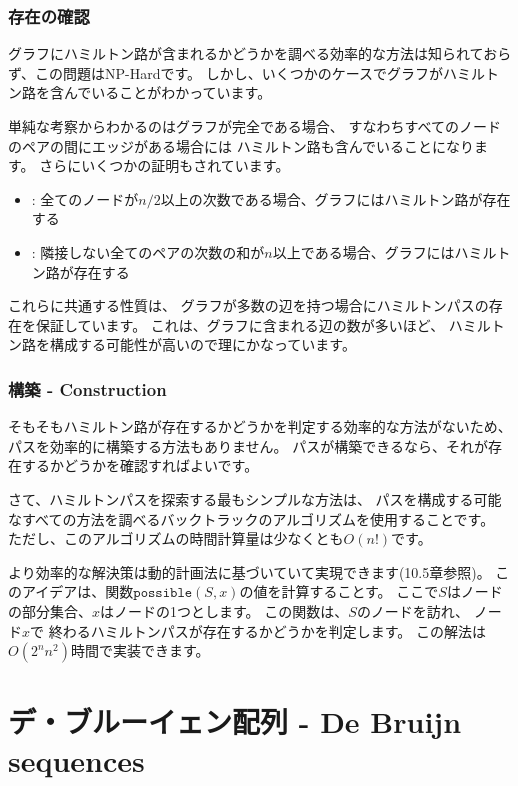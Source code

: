 \subsubsection{存在の確認}

グラフにハミルトン路が含まれるかどうかを調べる効率的な方法は知られておらず、この問題はNP-Hardです。
しかし、いくつかのケースでグラフがハミルトン路を含んでいることがわかっています。

単純な考察からわかるのはグラフが完全である場合、
すなわちすべてのノードのペアの間にエッジがある場合には
ハミルトン路も含んでいることになります。
さらにいくつかの証明もされています。

\begin{itemize}
\item
{}
: %
全てのノードが$n/2$以上の次数である場合、グラフにはハミルトン路が存在する
\item
{}
: %
隣接しない全てのペアの次数の和が$n$以上である場合、グラフにはハミルトン路が存在する
\end{itemize}

これらに共通する性質は、
グラフが多数の辺を持つ場合にハミルトンパスの存在を保証しています。
これは、グラフに含まれる辺の数が多いほど、
ハミルトン路を構成する可能性が高いので理にかなっています。

\subsubsection{構築 - Construction}

そもそもハミルトン路が存在するかどうかを判定する効率的な方法がないため、
パスを効率的に構築する方法もありません。
パスが構築できるなら、それが存在するかどうかを確認すればよいです。

さて、ハミルトンパスを探索する最もシンプルな方法は、
パスを構成する可能なすべての方法を調べるバックトラックのアルゴリズムを使用することです。
ただし、このアルゴリズムの時間計算量は少なくとも$O(n!)$です。

より効率的な解決策は動的計画法に基づいていて実現できます(10.5章参照)。
このアイデアは、関数$\texttt{possible}(S,x)$の値を計算することす。
ここで$S$はノードの部分集合、$x$はノードの1つとします。
この関数は、$S$のノードを訪れ、
ノード$x$で 終わるハミルトンパスが存在するかどうかを判定します。
この解法は$O(2^n n^2)$時間で実装できます。

\section{デ・ブルーイェン配列 - De Bruijn sequences}

